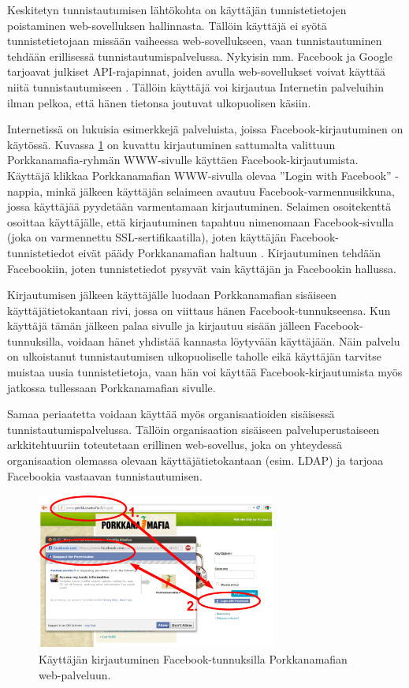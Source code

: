 Keskitetyn tunnistautumisen lähtökohta on käyttäjän tunnistetietojen poistaminen web-sovelluksen hallinnasta. Tällöin käyttäjä ei syötä tunnistetietojaan missään vaiheessa web-sovellukseen, vaan tunnistautuminen tehdään erillisessä tunnistautumispalvelussa. Nykyisin mm. Facebook ja Google tarjoavat julkiset API-rajapinnat, joiden avulla web-sovellukset voivat käyttää niitä tunnistautumiseen \cite{facebook}. Tällöin käyttäjä voi kirjautua Internetin palveluihin ilman pelkoa, että hänen tietonsa joutuvat ulkopuolisen käsiin.

Internetissä on lukuisia esimerkkejä palveluista, joissa Facebook-kirjautuminen on käytössä. Kuvassa \ref{facebook_login} on kuvattu kirjautuminen sattumalta valittuun Porkkanamafia-ryhmän WWW-sivulle käyttäen Facebook-kirjautumista. Käyttäjä klikkaa Porkkanamafian WWW-sivulla olevaa ''Login with Facebook'' -nappia, minkä jälkeen käyttäjän selaimeen avautuu Facebook-varmennusikkuna, jossa käyttäjää pyydetään varmentamaan kirjautuminen. Selaimen osoitekenttä osoittaa käyttäjälle, että kirjautuminen tapahtuu nimenomaan Facebook-sivulla (joka on varmennettu SSL-sertifikaatilla), joten käyttäjän Facebook-tun\-nis\-te\-tie\-dot eivät päädy Porkkanamafian haltuun \cite{facebook}. Kirjautuminen tehdään Facebookiin, joten tunnistetiedot pysyvät vain käyttäjän ja Facebookin hallussa.

Kirjautumisen jälkeen käyttäjälle luodaan Porkkanamafian sisäiseen käyttäjätietokantaan rivi, jossa on viittaus hänen Facebook-tunnukseensa. Kun käyttäjä tämän jälkeen palaa sivulle ja kirjautuu sisään jälleen Facebook-tunnuksilla, voidaan hänet yhdistää kannasta löytyvään käyttäjään. Näin palvelu on ulkoistanut tunnistautumisen ulkopuoliselle taholle eikä käyttäjän tarvitse muistaa uusia tunnistetietoja, vaan hän voi käyttää Facebook-kirjautumista myös jatkossa tullessaan Porkkanamafian sivulle.

Samaa periaatetta voidaan käyttää myös organisaatioiden sisäisessä tunnistautumispalvelussa. Tällöin organisaation sisäiseen palveluperustaiseen arkkitehtuuriin toteutetaan erillinen web-sovellus, joka on yhteydessä organisaation olemassa olevaan käyttäjätietokantaan (esim. LDAP) ja tarjoaa Facebookia vastaavan tunnistautumisen.

\begin{figure}[ht]
\centering
\includegraphics[width=0.7\textwidth]{tunnistautuminen/keskitetty/facebook.eps}
\caption{Käyttäjän kirjautuminen Facebook-tunnuksilla Porkkanamafian web-palveluun.}%
\label{facebook_login}
\end{figure}